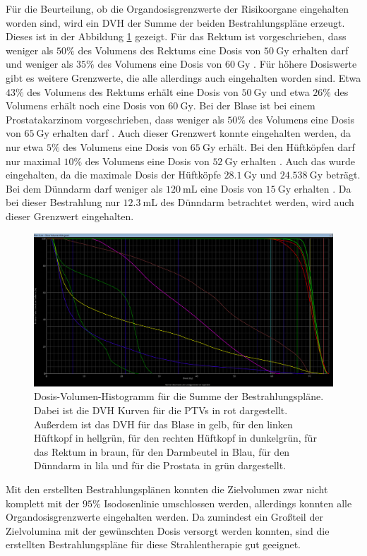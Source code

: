 Für die Beurteilung, ob die Organdosisgrenzwerte der Risikoorgane eingehalten worden sind,
wird ein DVH der Summe der beiden Bestrahlungspläne erzeugt. Dieses ist in der Abbildung
\ref{abb:DVHsum} gezeigt. Für das Rektum ist vorgeschrieben, dass
weniger als $50\%$ des Volumens des Rektums eine Dosis von $\SI{50}{\gray}$ erhalten darf und weniger als $35\%$
des Volumens eine Dosis von $\SI{60}{\gray}$ \cite{QUANTEC}. Für höhere Dosiswerte gibt es weitere Grenzwerte, die alle allerdings auch
eingehalten worden sind. Etwa $43\%$ des Volumens des Rektums erhält eine Dosis von $\SI{50}{\gray}$ und etwa $26\%$ des Volumens erhält noch eine
Dosis von $\SI{60}{\gray}$.
Bei der Blase ist bei einem Prostatakarzinom vorgeschrieben, dass weniger als $50\%$ des Volumens eine Dosis von $\SI{65}{\gray}$
erhalten darf \cite{QUANTEC}. Auch dieser Grenzwert konnte eingehalten werden, da nur etwa $5\%$ des Volumens eine Dosis von $\SI{65}{\gray}$
erhält. Bei den Hüftköpfen darf nur maximal $10\%$ des Volumens eine Dosis von $\SI{52}{\gray}$ erhalten \cite{QUANTEC}. Auch das wurde eingehalten, da
die maximale Dosis der Hüftköpfe $\SI{28.1}{\gray}$ und $\SI{24.538}{\gray}$ beträgt.
Bei dem Dünndarm darf weniger als $\SI{120}{\milli\liter}$ eine Dosis von $\SI{15}{\gray}$ erhalten \cite{QUANTEC}. Da
bei dieser Bestrahlung nur $\SI{12.3}{\milli\liter}$ des Dünndarm betrachtet werden, wird auch dieser Grenzwert eingehalten.


\begin{figure}[H]
  \centering
  \includegraphics[width=\textwidth]{Bilder/DVHsum.png}
  \caption{Dosis-Volumen-Histogramm  für die Summe der Bestrahlungspläne. Dabei ist die DVH Kurven für die PTVs in rot dargestellt. Außerdem ist das DVH für das Blase in gelb, für den linken Hüftkopf in hellgrün, für den rechten Hüftkopf in dunkelgrün, für das Rektum in braun, für den Darmbeutel in Blau, für den Dünndarm in lila und für die Prostata in grün dargestellt.}
  \label{abb:DVHsum}
\end{figure}

Mit den erstellten Bestrahlungsplänen konnten die Zielvolumen zwar nicht komplett
mit der $95\%$ Isodosenlinie umschlossen werden, allerdings konnten alle Organdosisgrenzwerte
eingehalten werden. Da zumindest ein Großteil der Zielvolumina mit der gewünschten
Dosis versorgt werden konnten, sind die erstellten Bestrahlungspläne für diese Strahlentherapie gut geeignet.
